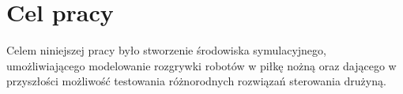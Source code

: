 

\section{Cel pracy}
Celem niniejszej pracy było stworzenie środowiska symulacyjnego, umożliwiającego modelowanie rozgrywki robotów w piłkę nożną oraz 
dającego w przyszłości możliwość testowania różnorodnych rozwiązań sterowania drużyną.


